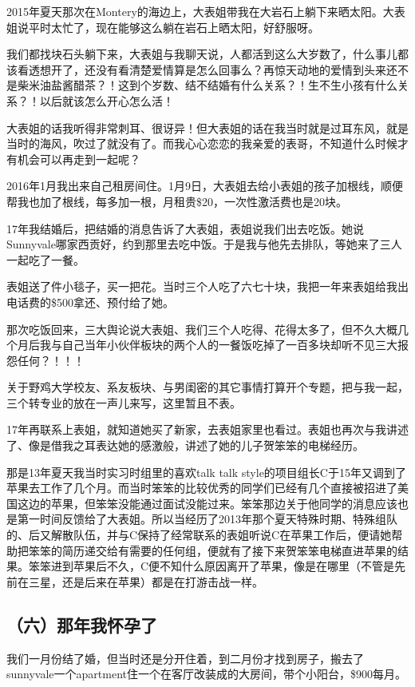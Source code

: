 \documentclass[9pt, b5paper]{article}
\begin{document}
2015年夏天那次在Montery的海边上，大表姐带我在大岩石上躺下来晒太阳。大表姐说平时太忙了，现在能够这么躺在岩石上晒太阳，好舒服呀。

我们都找块石头躺下来，大表姐与我聊天说，人都活到这么大岁数了，什么事儿都该看透想开了，还没有看清楚爱情算是怎么回事么？再惊天动地的爱情到头来还不是柴米油盐酱醋茶？！这到个岁数、结不结婚有什么关系？！生不生小孩有什么关系？！以后就该怎么开心怎么活！

大表姐的话我听得非常刺耳、很讶异！但大表姐的话在我当时就是过耳东风，就是当时的海风，吹过了就没有了。而我心心恋恋的我亲爱的表哥，不知道什么时候才有机会可以再走到一起呢？

2016年1月我出来自己租房间住。1月9日，大表姐去给小表姐的孩子加根线，顺便帮我也加了根线，每多加一根，月租贵\$20，一次性激活费也是20块。 

17年我结婚后，把结婚的消息告诉了大表姐，表姐说我们出去吃饭。她说Sunnyvale哪家西贡好，约到那里去吃中饭。于是我与他先去排队，等她来了三人一起吃了一餐。

表姐送了件小毯子，买一把花。当时三个人吃了六七十块，我把一年来表姐给我出电话费的\$500拿还、预付给了她。

那次吃饭回来，三大舆论说大表姐、我们三个人吃得、花得太多了，但不久大概几个月后我与自己当年小伙伴板块的两个人的一餐饭吃掉了一百多块却听不见三大报怨任何？！！！

关于野鸡大学校友、系友板块、与男闺密的其它事情打算开个专题，把与我一起，三个转专业的放在一声儿来写，这里暂且不表。 

17年再联系上表姐，就知道她买了新家，去表姐家里也看过。表姐也再次与我讲述了、像是借我之耳表达她的感激般，讲述了她的儿子贺笨笨的电梯经历。

那是13年夏天我当时实习时组里的喜欢talk talk style的项目组长C于15年又调到了苹果去工作了几个月。而当时笨笨的比较优秀的同学们已经有几个直接被招进了美国这边的苹果，但笨笨没能通过面试没能过来。笨笨那边关于他同学的消息应该也是第一时间反馈给了大表姐。所以当经历了2013年那个夏天特殊时期、特殊组队的、后又解散队伍，并与C保持了经常联系的表姐听说C在苹果工作后，便请她帮助把笨笨的简历递交给有需要的任何组，便就有了接下来贺笨笨电梯直进苹果的结果。笨笨进到苹果后不久，C便不知什么原因离开了苹果，像是在哪里（不管是先前在三星，还是后来在苹果）都是在打游击战一样。 

\subsection{（六）那年我怀孕了}
\label{sec:orgf0820bb}

我们一月份结了婚，但当时还是分开住着，到二月份才找到房子，搬去了sunnyvale一个apartment住一个在客厅改装成的大房间，带个小阳台，\$900每月。
\end{document}
